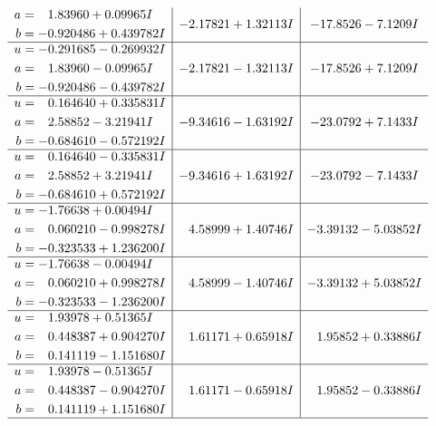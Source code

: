 \documentclass[1p]{elsarticle_modified}
\theoremstyle{definition}
\begin{document}
$$\begin{array}{c|c|c}
\begin{aligned}
a &= \phantom{-}1.83960 + 0.09965 I \\
b &= -0.920486 + 0.439782 I\end{aligned}
 & -2.17821 + 1.32113 I & -17.8526 - 7.1209 I \\ \hline\begin{aligned}
u &= -0.291685 - 0.269932 I \\
a &= \phantom{-}1.83960 - 0.09965 I \\
b &= -0.920486 - 0.439782 I\end{aligned}
 & -2.17821 - 1.32113 I & -17.8526 + 7.1209 I \\ \hline\begin{aligned}
u &= \phantom{-}0.164640 + 0.335831 I \\
a &= \phantom{-}2.58852 - 3.21941 I \\
b &= -0.684610 - 0.572192 I\end{aligned}
 & -9.34616 - 1.63192 I & -23.0792 + 7.1433 I \\ \hline\begin{aligned}
u &= \phantom{-}0.164640 - 0.335831 I \\
a &= \phantom{-}2.58852 + 3.21941 I \\
b &= -0.684610 + 0.572192 I\end{aligned}
 & -9.34616 + 1.63192 I & -23.0792 - 7.1433 I \\ \hline\begin{aligned}
u &= -1.76638 + 0.00494 I \\
a &= \phantom{-}0.060210 - 0.998278 I \\
b &= -0.323533 + 1.236200 I\end{aligned}
 & \phantom{-}4.58999 + 1.40746 I & -3.39132 - 5.03852 I \\ \hline\begin{aligned}
u &= -1.76638 - 0.00494 I \\
a &= \phantom{-}0.060210 + 0.998278 I \\
b &= -0.323533 - 1.236200 I\end{aligned}
 & \phantom{-}4.58999 - 1.40746 I & -3.39132 + 5.03852 I \\ \hline\begin{aligned}
u &= \phantom{-}1.93978 + 0.51365 I \\
a &= \phantom{-}0.448387 + 0.904270 I \\
b &= \phantom{-}0.141119 - 1.151680 I\end{aligned}
 & \phantom{-}1.61171 + 0.65918 I & \phantom{-}1.95852 + 0.33886 I \\ \hline\begin{aligned}
u &= \phantom{-}1.93978 - 0.51365 I \\
a &= \phantom{-}0.448387 - 0.904270 I \\
b &= \phantom{-}0.141119 + 1.151680 I\end{aligned}
 & \phantom{-}1.61171 - 0.65918 I & \phantom{-}1.95852 - 0.33886 I\\
 \hline 
 \end{array}$$\newpage
\end{document}

